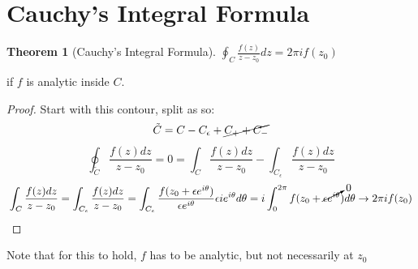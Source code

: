 \documentclass[11pt,notitlepage]{article}
\newtheorem{thm}{Theorem}[section]
\begin{document}
\section{Cauchy's Integral Formula}
\begin{thm}[Cauchy's Integral Formula]
$\oint_C \frac{f(z)}{z-z_0} dz = 2\pi i f(z_0)$ 
\end{thm}
\begin{flushright}
if $f$ is analytic inside $C$.
\end{flushright}
\begin{proof}

Start with this contour, split as so:
$$\tilde C = C - C_\epsilon +\cancel{C_{+} + C_{-}}$$
$$\oint_{\tilde C} \frac{f(z) dz}{z-z_0} 
= 0 
=\int_{C} \frac{f(z) dz}{z-z_0} -\int_{C_\epsilon} \frac{f(z) dz}{z-z_0}$$
$$\int_{C} \frac{f(z) dz}{z-z_0} 
= \int_{C_\epsilon} \frac{f(z) dz}{z-z_0}
= \int_{C_\epsilon} \frac{f(z_0 + \epsilon e^{i\theta}) }{\epsilon e^{i\theta}} \epsilon i e^{i\theta} d\theta 
= i \int_0^{2\pi} f(z_0 + \cancelto{0}{\epsilon e^{i\theta}}) d\theta \rightarrow 2\pi i f(z_0) $$
\end{proof}
Note that for this to hold, $f$ has to be analytic, but not necessarily at $z_0$
\end{document}
